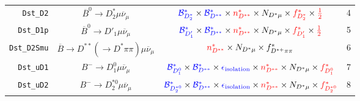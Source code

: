 \begin{landscape}
\begin{table}
\begin{tabular}{r|c|c|l}
      \texttt{Dst\_D2} &             $\overline{B}^0 \rightarrow D^*_2 \mu \overline{\nu}_\mu$             &                                                                                         $\textcolor{blue}{\mathcal{B}^{*}_{D_2^*}} \times \textcolor{blue}{\mathcal{B}^*_{D^{**}}} \times \textcolor{red}{n^{*}_{D^{**}}} \times N_{D^* \mu} \times \textcolor{red}{f^{*}_{D_2^*}} \times \textcolor{red}{\frac{1}{2}}$                                                                                         &                4 \\
     \texttt{Dst\_D1p} &             $\overline{B}^0 \rightarrow D'_1 \mu \overline{\nu}_\mu$              &                                                                                          $\textcolor{blue}{\mathcal{B}^{*}_{D'_1}} \times \textcolor{blue}{\mathcal{B}^*_{D^{**}}} \times \textcolor{red}{n^{*}_{D^{**}}} \times N_{D^* \mu} \times \textcolor{red}{f^{*}_{D'_1}} \times \textcolor{red}{\frac{1}{2}}$                                                                                          &                5 \\
   \texttt{Dst\_D2Smu} & $\overline{B} \rightarrow D^{**} (\rightarrow D^* \pi\pi) \mu \overline{\nu}_\mu$ &                                                                                                                                                                 $\textcolor{red}{n^{*}_{D^{**}}} \times N_{D^* \mu} \times f^*_{D^{*+}\pi\pi}$                                                                                                                                                                  &                6 \\
     \texttt{Dst\_uD1} &                  $B^- \rightarrow D_1^0 \mu \overline{\nu}_\mu$                   &                                                                                 $\textcolor{blue}{\mathcal{B}^{*}_{D_1^0}} \times \textcolor{blue}{\mathcal{B}^*_{D^{**}}} \times \textcolor{blue}{\epsilon_\text{isolation}} \times \textcolor{red}{n^{*}_{D^{**}}} \times N_{D^* \mu} \times \textcolor{red}{f^{*}_{D_1^0}}$                                                                                  &                7 \\
     \texttt{Dst\_uD2} &                 $B^- \rightarrow D_2^{*0} \mu \overline{\nu}_\mu$                 &                                                                              $\textcolor{blue}{\mathcal{B}^{*}_{D_2^{*0}}} \times \textcolor{blue}{\mathcal{B}^*_{D^{**}}} \times \textcolor{blue}{\epsilon_\text{isolation}} \times \textcolor{red}{n^{*}_{D^{**}}} \times N_{D^* \mu} \times \textcolor{red}{f^{*}_{D_2^{*0}}}$                                                                               &                8 \\

\end{tabular}
\end{table}
\end{landscape}
